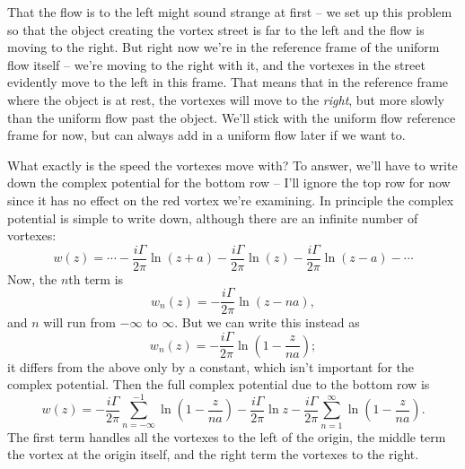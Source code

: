 That the flow is to the left might sound strange at first -- we set up this problem so that the object creating the vortex street is far to the left and the flow is moving to the right.  But right now we're in the reference frame of the uniform flow itself -- we're moving to the right with it, and the vortexes in the street evidently move to the left in this frame.  That means that in the reference frame where the object is at rest, the vortexes will move to the \emph{right}, but more slowly than the uniform flow past the object.  We'll stick with the uniform flow reference frame for now, but can always add in a uniform flow later if we want to.

What exactly is the speed the vortexes move with?  To answer, we'll have to write down the complex potential for the bottom row -- I'll ignore the top row for now since it has no effect on the red vortex we're examining.  In principle the complex potential is simple to write down, although there are an infinite number of vortexes:
\[
w(z) = \cdots - \frac{i\Gamma}{2\pi} \ln (z + a) - \frac{i\Gamma}{2\pi} \ln (z) - \frac{i\Gamma}{2\pi} \ln (z - a) - \cdots
\]
Now, the $n$th term is
\[
w_n(z) = -\frac{i\Gamma}{2\pi} \ln (z - na),
\]
and $n$ will run from $-\infty$ to $\infty$.  But we can write this instead as
\[
w_n(z) = -\frac{i\Gamma}{2\pi} \ln \left(1 - \frac{z}{na} \right);
\]
it differs from the above only by a constant, which isn't important for the complex potential.  Then the full complex potential due to the bottom row is
\begin{equation}
w(z) = -\frac{i\Gamma}{2\pi} \sum_{n=-\infty}^{-1} \ln \left(1 - \frac{z}{na} \right) - \frac{i\Gamma}{2\pi} \ln z -\frac{i\Gamma}{2\pi} \sum_{n=1}^{\infty} \ln \left(1 - \frac{z}{na} \right).
\end{equation}
The first term handles all the vortexes to the left of the origin, the middle term the vortex at the origin itself, and the right term the vortexes to the right.  

